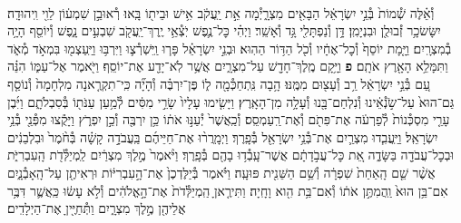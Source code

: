 \documentclass[twoside, openany, parskip=half, 11pt]{book}
\begin{document}
\begin{footnotesize}
\begin{multicols}{2}
\\
וְ֯אֵ֗לֶּה שְׁ֯מוֹת֙ בְּ֯נֵ֣י יִשְׂרָאֵ֔ל הַבָּאִ֖ים מִצְרָ֑יְ֯מָה אֵ֣ת יַֽעֲקֹ֔ב אִ֥ישׁ וּבֵית֖וֹ בָּֽאוּ׃ רְ֯אוּבֵ֣ן שִׁמְע֔וֹן לֵוִ֖י וִֽיהוּדָֽה׃ יִשָּׂשׂכָ֥ר זְ֯בוּלֻ֖ן וּבִנְיָמִֽן׃ דָּ֥ן וְ֯נַפְתָּלִ֖י גָּ֥ד וְ֯אָשֵֽׁר׃ וַיְהִ֗י כׇּל־נֶ֛פֶשׁ יֹֽצְ֯אֵ֥י יֶֽרֶךְ־יַֽעֲקֹ֖ב שִׁבְעִ֣ים נָ֑פֶשׁ וְ֯יוֹסֵ֖ף הָיָ֥ה בְ֯מִצְרָֽיִם׃ וַיָּ֤מָת יוֹסֵף֙ וְ֯כׇל־אֶחָ֔יו וְ֯כֹ֖ל הַדּ֥וֹר הַהֽוּא׃ וּבְנֵ֣י יִשְׂרָאֵ֗ל פָּר֧וּ וַֽיִּשְׁרְ֯צ֛וּ וַיִּרְבּ֥וּ וַיַּֽעַצְמ֖וּ בִּמְאֹ֣ד מְ֯אֹ֑ד וַתִּמָּלֵ֥א הָאָ֖רֶץ אֹתָֽם׃ \textbf{פ}
וַיָּ֥קָם מֶֽלֶךְ־חָדָ֖שׁ עַל־מִצְרָ֑יִם אֲשֶׁ֥ר לֹֽא־יָדַ֖ע אֶת־יוֹסֵֽף׃ וַיֹּ֖אמֶר אֶל־עַמּ֑וֹ הִנֵּ֗ה עַ֚ם בְּ֯נֵ֣י יִשְׂרָאֵ֔ל רַ֥ב וְ֯עָצ֖וּם מִמֶּֽנּוּ׃ הָ֥בָה נִּֽתְחַכְּ֯מָ֖ה ל֑וֹ פֶּן־יִרְבֶּ֗ה וְ֯הָיָ֞ה כִּֽי־תִקְרֶ֤אנָה מִלְחָמָה֙ וְ֯נוֹסַ֤ף גַּם־הוּא֙ עַל־שֹׂ֣נְ֯אֵ֔ינוּ וְ֯נִלְחַם־בָּ֖נוּ וְ֯עָלָ֥ה מִן־הָאָֽרֶץ׃ וַיָּשִׂ֤ימוּ עָלָיו֙ שָׂרֵ֣י מִסִּ֔ים לְ֯מַ֥עַן עַנֹּת֖וֹ בְּ֯סִבְלֹתָ֑ם וַיִּ֜בֶן עָרֵ֤י מִסְכְּ֯נוֹת֙ לְ֯פַרְעֹ֔ה אֶת־פִּתֹ֖ם וְ֯אֶת־רַֽעַמְסֵֽס׃ וְ֯כַֽאֲשֶׁר֙ יְ֯עַנּ֣וּ אֹת֔וֹ כֵּ֥ן יִרְבֶּ֖ה וְ֯כֵ֣ן יִפְרֹ֑ץ וַיָּקֻ֕צוּ מִפְּ֯נֵ֖י בְּ֯נֵ֥י יִשְׂרָאֵֽל׃  וַיַּֽעֲבִ֧דוּ מִצְרַ֛יִם אֶת־בְּ֯נֵ֥י יִשְׂרָאֵ֖ל בְּ֯פָֽרֶךְ׃ וַיְמָֽרֲר֨וּ אֶת־חַיֵּיהֶ֜ם בַּֽעֲבֹדָ֣ה קָשָׁ֗ה בְּ֯חֹ֨מֶר֙ וּבִלְבֵנִ֔ים וּבְכׇל־עֲבֹדָ֖ה בַּשָּׂדֶ֑ה אֵ֚ת כׇּל־עֲבֹ֣דָתָ֔ם אֲשֶׁר־עָֽבְ֯ד֥וּ בָהֶ֖ם בְּ֯פָֽרֶךְ׃ וַיֹּ֨אמֶר֙ מֶ֣לֶךְ מִצְרַ֔יִם לַֽמְיַלְּ֯דֹ֖ת הָֽעִבְרִיֹּ֑ת אֲשֶׁ֨ר שֵׁ֤ם הָֽאַחַת֙ שִׁפְרָ֔ה וְ֯שֵׁ֥ם הַשֵּׁנִ֖ית פּוּעָֽה׃ וַיֹּ֗אמֶר בְּ֯יַלֶּדְכֶן֙ אֶת־הָ֣עִבְרִיּ֔וֹת וּרְאִיתֶ֖ן עַל־הָֽאָבְ֯נָ֑יִם אִם־בֵּ֥ן הוּא֙ וַֽהֲמִתֶּ֣ן אֹת֔וֹ וְ֯אִם־בַּ֥ת הִ֖וא וָחָֽיָה׃ וַתִּירֶ֤אןָ הַֽמְיַלְּ֯דֹת֙ אֶת־הָ֣אֱלֹהִ֔ים וְ֯לֹ֣א עָשׂ֔וּ כַּֽאֲשֶׁ֛ר דִּבֶּ֥ר אֲלֵיהֶ֖ן מֶ֣לֶךְ מִצְרָ֑יִם וַתְּ֯חַיֶּ֖יןָ אֶת־הַיְלָדִֽים׃


\end{multicols}
\end{footnotesize}
\end{document}
